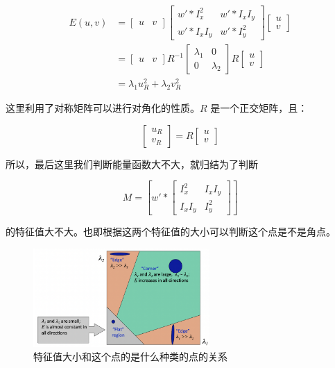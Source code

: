 \begin{equation}
    \begin{aligned}
    E(u,v)
    &= \begin{bmatrix} u & v \end{bmatrix} \begin{bmatrix} w' \ast I_x^2 & w' \ast I_xI_y \\ w' \ast I_xI_y & w' \ast I_y^2 \end{bmatrix} \begin{bmatrix} u \\ v \end{bmatrix}\\
    &= \begin{bmatrix} u & v \end{bmatrix} R^{-1} \begin{bmatrix} \lambda_1 & 0\\ 0 & \lambda_2 \end{bmatrix} R \begin{bmatrix} u \\ v \end{bmatrix}\\
    &= \lambda_1 u_R^2 + \lambda_2 v_R^2
    \end{aligned}
\end{equation}

这里利用了对称矩阵可以进行对角化的性质。$R$ 是一个正交矩阵，且：

\begin{equation}
    \begin{bmatrix} u_R \\ v_R \end{bmatrix} =  R \begin{bmatrix} u \\ v \end{bmatrix}
\end{equation}

所以，最后这里我们判断能量函数大不大，就归结为了判断 

\begin{equation}
    M = \left[
        w' *
        \begin{bmatrix}
        I_x^2 & I_x I_y \\
        I_x I_y & I_y^2
        \end{bmatrix}
    \right]
\end{equation}

的特征值大不大。也即根据这两个特征值的大小可以判断这个点是不是角点。

\begin{figure}[htbp]
    \centering
    \includegraphics[width=0.6\textwidth]{figures/corner_map.png}
    \caption{特征值大小和这个点的是什么种类的点的关系}
\end{figure}

